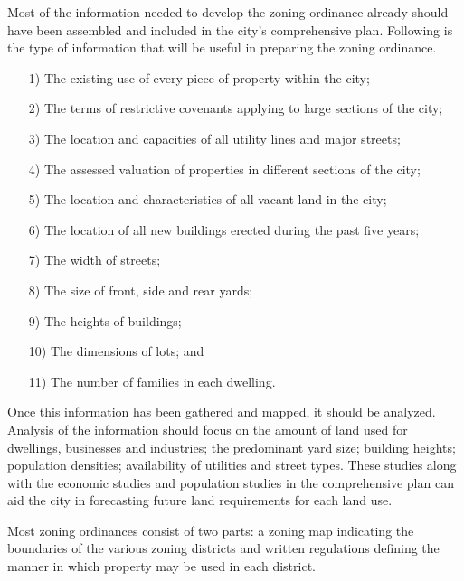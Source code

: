 Most of the information needed to develop the zoning ordinance already should
have been assembled and included in the city's comprehensive plan. Following is
the type of information that will be useful in preparing the zoning ordinance.
\begin{itemize}
\item[1)] The existing use of every piece of property within the city;

\item[2)] The terms of restrictive covenants applying to large sections of the
city;

\item[3)] The location and capacities of all utility lines and major streets;

\item[4)] The assessed valuation of properties in different sections of the
city;

\item[5)] The location and characteristics of all vacant land in the city;

\item[6)] The location of all new buildings erected during the past five years;

\item[7)] The width of streets;

\item[8)] The size of front, side and rear yards;

\item[9)] The heights of buildings;

\item[10)] The dimensions of lots; and

\item[11)] The number of families in each dwelling.
\end{itemize}
Once this information has been gathered and mapped, it should be analyzed.
Analysis of the information should focus on the amount of land used for
dwellings, businesses and industries; the predominant yard size; building
heights; population densities; availability of utilities and street types. These
studies along with the economic studies and population studies in the
comprehensive plan can aid the city in forecasting future land requirements for
each land use.



Most zoning ordinances consist of two parts: a zoning map indicating the
boundaries of the various zoning districts and written regulations defining the
manner in which property may be used in each district.



